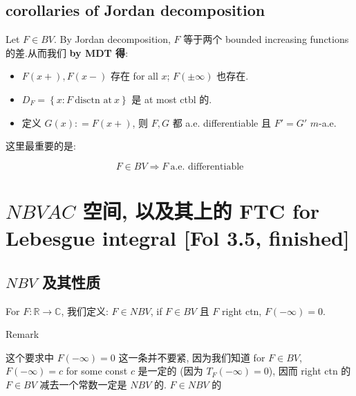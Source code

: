 \subsection{corollaries of Jordan decomposition}\label{corollaries-of-jordan-decomposition}

\begin{corollary}

Let \(F \in BV\). By Jordan decomposition, \(F\) 等于两个 bounded increasing functions 的差.从而我们 \textbf{by MDT 得}:

\begin{itemize}
\item
  \(F(x + ),F(x - )\) 存在 for all \(x\); \(F( \pm \infty)\) 也存在.
\item
  \(D_{F} = \left\{ {x:F\ \text{disctn at}\ x} \right\}\) 是 at most ctbl 的.
\item
  定义 \(G(x): = F(x + )\), 则 \(F,G\) 都 a.e. differentiable 且 \(F' = G'\) \(m\)-a.e.
\end{itemize}

\end{corollary}

这里最重要的是:

\[F \in BV\Longrightarrow F\ \text{a.e. differentiable}\]

\section{\texorpdfstring{\(NBV AC\) 空间, 以及其上的 FTC for Lebesgue integral {[}Fol 3.5, finished{]}}{NBV AC 空间, 以及其上的 FTC for Lebesgue integral {[}Fol 3.5, finished{]}}}

\subsection{\texorpdfstring{\(NBV\) 及其性质}{NBV 及其性质}}\label{nbv-ux53caux5176ux6027ux8d28}

\begin{definition}{}

For \(F:\mathbb{R}\rightarrow\mathbb{C}\), 我们定义: \(F \in NBV\), if \(F \in BV\) 且 \(F\) right ctn, \(F( - \infty) = 0\).

\end{definition}

\begin{qlremark}{Remark}

这个要求中 \(F( - \infty) = 0\) 这一条并不要紧, 因为我们知道 for \(F \in BV\), \(F( - \infty) = c\) for some const \(c\) 是一定的 (因为 \(T_{F}( - \infty) = 0\)), 因而 right ctn 的 \(F \in BV\) 减去一个常数一定是 \(NBV\) 的. \(F \in NBV\) 的

\end{qlremark}


